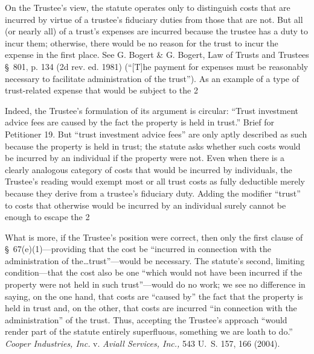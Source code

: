 {  On the Trustee's view, the statute operates only to distinguish costs that are incurred by virtue of a trustee's fiduciary duties from those that are not. But all (or nearly all) of a trust's expenses are incurred because the trustee has a duty to incur them; otherwise, there would be no reason for the trust to incur the expense in the first place. See G. Bogert \& G. Bogert, Law of Trusts and Trustees \S~801, p. 134 (2d rev. ed. 1981) (``[T]he payment for expenses must be reasonably necessary to facilitate administration of the trust''). As an example of a type of trust-related expense that would be subject to the 2%

  Indeed, the Trustee's formulation of its argument is circular: ``Trust investment advice fees are caused by the fact the property is held in trust.'' Brief for Petitioner 19. But ``trust investment advice fees'' are only aptly described as such because the property is held in trust; the statute asks whether such costs would be incurred by an individual if the property were not. Even when there is a clearly analogous category of costs that would be incurred by individuals, the Trustee's reading would exempt most or all trust costs as fully deductible merely because they derive from a trustee's fiduciary duty. Adding the modifier ``trust'' to costs that otherwise would be incurred by an individual surely cannot be enough to escape the 2%

  What is more, if the Trustee's position were correct, then only the first clause of \S~67(e)(1)---providing that the cost be ``incurred in connection with the administration of the\dots trust''---would be necessary. The statute's second, limiting condition---that the cost also be one ``which would not have been incurred if the property were not held in such trust''---would do no work; we see no difference in saying, on the one hand, that costs are ``caused by'' the fact that the property is held in trust and, on the other, that costs are incurred ``in connection with the administration'' of the trust. Thus, accepting the Trustee's approach ``would render part of the statute entirely superfluous, something we are loath to do.'' \emph{Cooper Industries, Inc.} v. \emph{Aviall Services, Inc.,} 543 U.~S. 157, 166 (2004).

}
